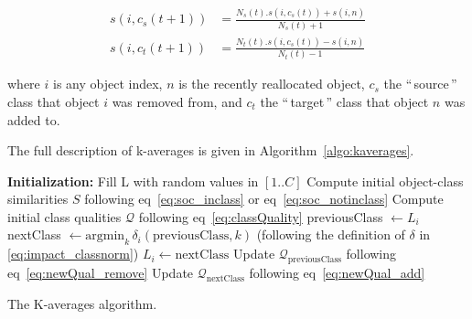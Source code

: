 \documentclass[10pt,journal,compsoc]{IEEEtran}
\newcommand{\gl}[1]{``\,#1\,''} %
\begin{document}

\begin{equation}
	\begin{aligned}
    s(i, c_s(t+1)) &= \frac{N_s(t).s(i, c_s(t)) + s(i,n)}{N_s(t)+1} \\
    s(i, c_t(t+1)) &= \frac{N_t(t).s(i, c_s(t)) - s(i,n)}{N_t(t)-1}
   	\end{aligned}
  \label{eq:newSimilNewC}
\end{equation}

\noindent where $i$ is any object index, $n$ is the recently reallocated object, $c_s$ the \gl{source} class that object $i$ was removed from, and $c_t$ the \gl{target} class that object $n$ was added to.

The full description of k-averages is given in Algorithm~\ref{algo:kaverages}.

\begin{algorithm}
	\label{algo:kaverages}
	\SetAlgoLined
	\BlankLine	
	\textbf{Initialization:}
		Fill L with random values in $[1..C]$\;
		Compute initial object-class similarities $S$ following eq~\ref{eq:soc_inclass} or eq~\ref{eq:soc_notinclass}\;
		Compute initial class qualities $\mathcal{Q}$ following eq~\ref{eq:classQuality}\;
	\BlankLine	
	 {
		 {
			previousClass $\leftarrow L_i$\;
			nextClass $\leftarrow \mathrm{argmin}_k\,\delta_i(\mathrm{previousClass}, k)$ \label{algline:kaverages_search}
			(following the definition of $\delta$ in  \ref{eq:impact_classnorm})\; %
			 {
				$L_i \leftarrow \mathrm{nextClass}$\;
				Update $\mathcal{Q}_\mathrm{previousClass}$ following eq~\ref{eq:newQual_remove}\;
				Update $\mathcal{Q}_\mathrm{nextClass}$ following eq~\ref{eq:newQual_add}\;
			}
		}
	}
	\BlankLine
	\caption{The K-averages algorithm.}
\end{algorithm}
\end{document}
